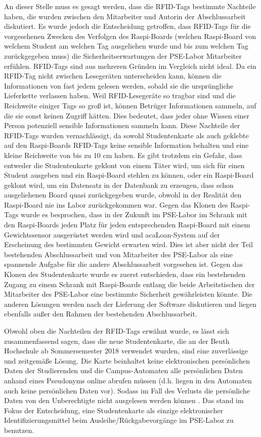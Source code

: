 An dieser Stelle muss es gesagt werden, dass die RFID-Tags bestimmte Nachteile haben, die wurden zwischen den Mitarbeiter und Autorin der Abschlussarbeit diskutiert. Es wurde jedoch die Entscheidung getroffen, dass RFID-Tags für die vorgesehenen Zwecken des Verfolgen des Raspi-Boards (welchen Raspi-Board von welchem Student am welchen Tag ausgeliehen wurde und bis zum welchen Tag zurückgegeben muss) die Sicherheitserwartungen der PSE-Labor Mitarbeiter erfühlen. RFID-Tags sind aus mehreren Gründen im Vergleich nicht ideal. Da ein RFID-Tag nicht zwischen Lesegeräten unterscheiden kann, können die Informationen von fast jedem gelesen werden, sobald sie die ursprüngliche Lieferkette verlassen haben. Weil RFID-Lesegeräte so tragbar sind und die Reichweite einiger Tags so groß ist, können Betrüger Informationen sammeln, auf die sie sonst keinen Zugriff hätten. Dies bedeutet, dass jeder ohne Wissen einer Person potenziell sensible Informationen sammeln kann. Diese Nachteile der RFID-Tags wurden vernachlässigt, da sowohl Studentenkarte als auch geklebte auf den Raspi-Boards RFID-Tags keine sensible Information behalten und eine kleine Reichweite von bis zu 10 cm haben. Es gibt trotzdem ein Gefahr, dass entweder die Studentenkarte geklont von einem Täter wird, um sich für einen Student ausgeben und ein Raspi-Board stehlen zu können, oder ein Raspi-Board geklont wird, um ein Datensatz in der Datenbank zu erzeugen, dass schon ausgeliehenen Board quasi zurückgegeben wurde, obwohl in der Realität den Raspi-Board nie ins Labor zurückgekommen war. Gegen das Klonen des Raspi-Tags wurde es besprochen, dass in der Zukunft im PSE-Labor im Schrank mit den Raspi-Boards jeden Platz für jeden entsprechenden Raspi-Board mit einem Gewichtssensor ausgerüstet werden wird und acaLoan-System auf der Erscheinung des bestimmten Gewicht erwarten wird. Dies ist aber nicht der Teil bestehenden Abschlussarbeit und von Mitarbeiter des PSE-Labor als eine spannende Aufgabe für die andere Abschlussarbeit vorgesehen ist. Gegen das Klonen des Studentenkarte wurde es zuerst entschieden, dass ein bestehenden Zugang zu einem Schrank mit Raspi-Boards entlang die beide Arbeitstischen der Mitarbeiter des PSE-Labor eine bestimmte Sicherheit gewährleisten könnte. Die anderen Lösungen werden nach der Lieferung der Software diskutieren und liegen ebenfalls außer den Rahmen der bestehenden Abschlussarbeit. 

Obwohl oben die Nachteilen der RFID-Tags erwähnt wurde, es lässt sich zusammenfassend sagen, dass die neue Studentenkarte, die an der Beuth Hochschule ab Sommersemester 2018 verwendet wurden, sind eine zuverlässige und zeitgemäße Lösung. Die Karte beinhaltet keine elektronischen persönlichen Daten der Studierenden und die Campus-Automaten alle persönlichen Daten anhand eines Pseudonyms online abrufen müssen (d.h. liegen in den Automaten auch keine persönlichen Daten vor). Sodass im Fall des Verlusts die persönliche Daten von den Unberechtigte nicht ausgelesen werden können \cite{website:12}. Das stand im Fokus der Entscheidung, eine Studentenkarte als einzige elektronischer Identifizierungsmittel beim Ausleihe/Rückgabevorgänge im PSE-Laboz zu benutzen.

